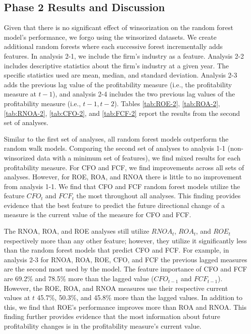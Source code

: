 \subsection{Phase 2 Results and Discussion}

Given that there is no significant effect of winsorization on the random forest model's performance, we forgo using the winsorized datasets. We create additional random forests where each successive forest incrementally adds features. In analysis 2-1, we include the firm's industry as a feature. Analysis 2-2 includes descriptive statistics about the firm's industry at a given year. The specific statistics used are mean, median, and standard deviation. Analysis 2-3 adds the previous lag value of the profitability measure (i.e., the profitability measure at \(t-1\)), and analysis 2-4 includes the two previous lag values of the profitability measure (i.e., \(t-1, t-2\)). Tables \ref{tab:ROE-2}, \ref{tab:ROA-2}, \ref{tab:RNOA-2}, \ref{tab:CFO-2}, and \ref{tab:FCF-2} report the results from the second set of analyses. 

Similar to the first set of analyses, all random forest models outperform the random walk models. Comparing the second set of analyses to analysis 1-1 (non-winsorized data with a minimum set of features), we find mixed results for each profitability measure. For CFO and FCF, we find improvements across all sets of analyses. However, for ROE, ROA, and RNOA there is little to no improvement from analysis 1-1.  We find that CFO and FCF random forest models utilize the feature \(CFO_t\) and \(FCF_t\) the most throughout all analyses. This finding provides evidence that the best feature to predict the future directional change of a measure is the current value of the measure for CFO and FCF. 

The RNOA, ROA, and ROE analyses still utilize \(RNOA_t\), \(ROA_t\), and \(ROE_t\) respectively more than any other feature; however, they utilize it significantly less than the random forest models that predict CFO and FCF. For example, in analysis 2-3  for RNOA, ROA, ROE, CFO, and FCF the previous lagged measures are the second most used by the model. The feature importance of CFO and FCF are 69.2\% and 78.5\% more than the lagged value (\(CFO_{t-1}\) and \(FCF_{t-1}\)). However, the ROE, ROA, and RNOA measures use their respective current values at \(t\) 45.7\%, 50.3\%, and 45.8\% more than the lagged values. In addition to this, we find that ROE's performance improves more than ROA and RNOA. This finding further provides evidence that the most information about future profitability changes is in the profitability measure's current value.

